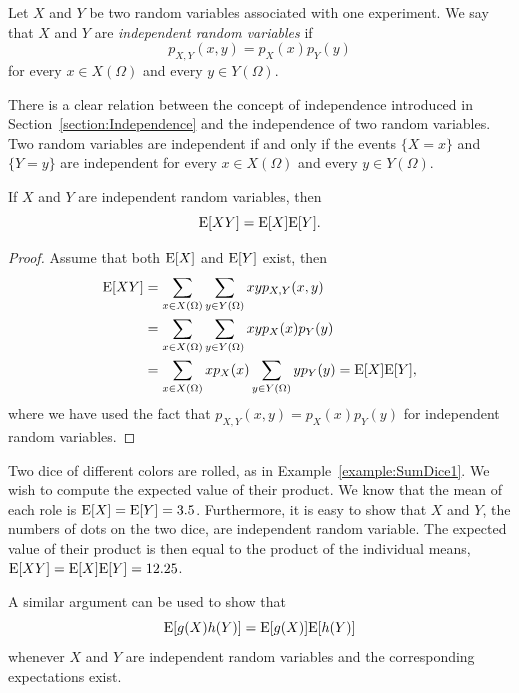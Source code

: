 Let $X$ and $Y$ be two random variables associated with one experiment.
We say that $X$ and $Y$ are \emph{independent random variables} if 
\begin{equation*}
p_{X,Y} (x,y) = p_X (x) p_Y (y)
\end{equation*}
for every $x \in X(\Omega)$ and every $y \in Y(\Omega)$.

There is a clear relation between the concept of independence introduced in Section~\ref{section:Independence} and the independence of two random variables.
Two random variables are independent if and only if the events $\{ X = x \}$ and $\{ Y = y \}$ are independent for every $x \in X(\Omega)$ and every $y \in Y(\Omega)$.

\begin{proposition}
If $X$ and $Y$ are independent random variables, then
\begin{equation*}
\mathrm{E} [X Y] = \mathrm{E} [X] \mathrm{E} [Y] .
\end{equation*}
\end{proposition}
\begin{proof}
Assume that both $\mathrm{E} [X]$ and $\mathrm{E}[Y]$ exist, then
\begin{equation*}
\begin{split}
\mathrm{E} [XY]
&= \sum_{x \in X(\Omega)} \sum_{y \in Y(\Omega)} x y p_{X,Y} (x,y) \\
&= \sum_{x \in X(\Omega)} \sum_{y \in Y(\Omega)} x y p_X (x) p_Y (y) \\
&= \sum_{x \in X(\Omega)} x p_X (x) \sum_{y \in Y(\Omega)} y p_Y (y)
= \mathrm{E} [X] \mathrm{E} [Y] ,
\end{split}
\end{equation*}
where we have used the fact that $p_{X,Y} (x,y) = p_X (x) p_Y (y)$ for independent random variables.
\end{proof}

\begin{example}
Two dice of different colors are rolled, as in Example~\ref{example:SumDice1}.
We wish to compute the expected value of their product.
We know that the mean of each role is $\mathrm{E} [X] = \mathrm{E} [Y] = 3.5$.
Furthermore, it is easy to show that $X$ and $Y$, the numbers of dots on the two dice, are independent random variable.
The expected value of their product is then equal to the product of the individual means, $\mathrm{E} [XY] = \mathrm{E} [X] \mathrm{E} [Y] = 12.25$.
\end{example}

A similar argument can be used to show that
\begin{equation} \label{equation:DiscreteProduct}
\mathrm{E}[ g(X) h(Y) ] = \mathrm{E} [ g(X) ] \mathrm{E} [ h(Y) ]
\end{equation}
whenever $X$ and $Y$ are independent random variables and the corresponding expectations exist.


